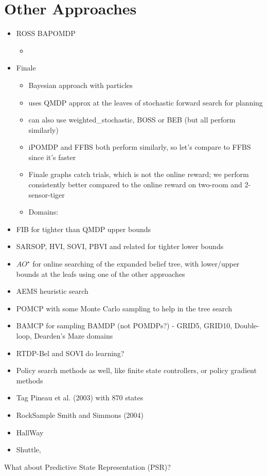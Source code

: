 \documentclass[10pt,english]{article}
\begin{document}
\section{Other Approaches}

\begin{itemize}
	\item ROSS BAPOMDP
	\begin{itemize}
		\item
	\end{itemize}
	\item Finale
	\begin{itemize}
		\item Bayesian approach with particles
		\item uses QMDP approx at the leaves of stochastic forward search for planning
		\item can also use weighted\_stochastic, BOSS or BEB (but all perform similarly)
		\item iPOMDP and FFBS both perform similarly, so let's compare to FFBS since it's faster
		\item Finale graphs catch trials, which is not the online reward; we perform consistently better compared to the online reward on two-room and 2-sensor-tiger
		\item Domains:
	\end{itemize}
	\item FIB for tighter than QMDP upper bounds
	\item SARSOP, HVI, SOVI, PBVI and related for tighter lower bounds
	\item $AO^\star$ for online searching of the expanded belief tree, with lower/upper bounds at the leafs using one of the other approaches
	\item AEMS heuristic search
	\item POMCP with some Monte Carlo sampling to help in the tree search
	\item BAMCP for sampling BAMDP (not POMDPs?) - GRID5, GRID10, Double-loop, Dearden’s Maze domains
	\item RTDP-Bel and SOVI do learning?
	\item Policy search methods as well, like finite state controllers, or policy gradient methods
\end{itemize}

\begin{itemize}
	\item Tag Pineau et al. (2003) with 870 states
	\item RockSample Smith and Simmons (2004)
	\item HallWay
	\item Shuttle, 
\end{itemize}

What about Predictive State Representation (PSR)?
\end{document}
